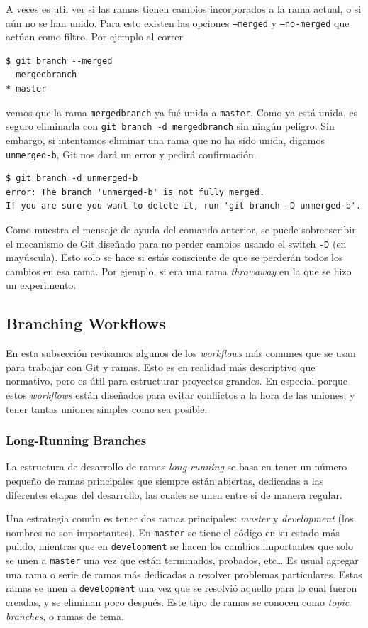 \documentclass[spanish, 12pt, a4paper]{article}
\begin{document}
A veces es util ver si las ramas tienen cambios incorporados a la rama actual, o si aún no se han unido.
Para esto existen las opciones \texttt{--merged} y \texttt{--no-merged} que actúan como filtro.
Por ejemplo al correr
\begin{lstlisting}
$ git branch --merged
  mergedbranch
* master
\end{lstlisting}
vemos que la rama \texttt{mergedbranch} ya fué unida a \texttt{master}.
Como ya está unida, es seguro eliminarla con \texttt{git branch -d mergedbranch} sin ningún peligro.
Sin embargo, si intentamos eliminar una rama que no ha sido unida, digamos \texttt{unmerged-b}, Git nos dará un error y pedirá confirmación.
\begin{lstlisting}
$ git branch -d unmerged-b
error: The branch 'unmerged-b' is not fully merged.
If you are sure you want to delete it, run 'git branch -D unmerged-b'.
\end{lstlisting}

Como muestra el mensaje de ayuda del comando anterior, se puede sobreescribir el mecanismo de Git diseñado para no perder cambios usando el switch \texttt{-D} (en mayúscula).
Esto solo se hace si estás consciente de que se perderán todos los cambios en esa rama.
Por ejemplo, si era una rama \textit{throwaway} en la que se hizo un experimento.

\subsection{Branching Workflows}
En esta subsección revisamos algunos de los \textit{workflows} más comunes que se usan para trabajar con Git y ramas.
Esto es en realidad más descriptivo que normativo, pero es útil para estructurar proyectos grandes.
En especial porque estos \textit{workflows} están diseñados para evitar conflictos a la hora de las uniones, y tener tantas uniones simples como sea posible.

\subsubsection{Long-Running Branches}
La estructura de desarrollo de ramas \textit{long-running} se basa en tener un número pequeño de ramas principales que siempre están abiertas, dedicadas a las diferentes etapas del desarrollo, las cuales se unen entre si de manera regular.

Una estrategia común es tener dos ramas principales: \textit{master} y \textit{development} (los nombres no son importantes).
En \texttt{master} se tiene el código en su estado más pulido, mientras que en \texttt{development} se hacen los cambios importantes que solo se unen a \texttt{master} una vez que están terminados, probados, etc\dots
Es usual agregar una rama o serie de ramas más dedicadas a resolver problemas particulares.
Estas ramas se unen a \texttt{development} una vez que se resolvió aquello para lo cual fueron creadas, y se eliminan poco después.
Este tipo de ramas se conocen como \textit{topic branches}, o ramas de tema.
\end{document}
